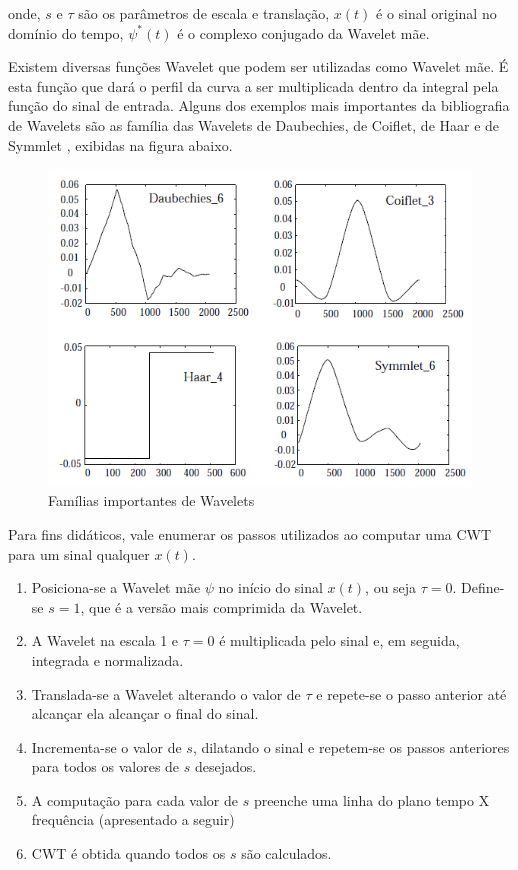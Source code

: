 \documentclass[12pt]{article}
\begin{document}
	onde, $s$ e $\tau$ são os parâmetros de escala e translação, $x(t)$ é o sinal original no domínio do tempo, $\psi^*(t)$ é o complexo conjugado da \textrm{Wavelet} mãe. 
	
	Existem diversas funções \textrm{Wavelet} que podem ser utilizadas como \textrm{Wavelet} mãe. É esta função que dará o perfil da curva a ser multiplicada dentro da integral pela função do sinal de entrada. Alguns dos exemplos mais importantes da bibliografia de \textrm{Wavelets} são as família das \textrm{Wavelets} de \textrm{Daubechies}, de \textrm{Coiflet}, de \textrm{Haar} e de \textrm{Symmlet} \cite{Wave_Graps}, exibidas na figura abaixo.
	\begin{figure}[H]
		\centering
		\includegraphics[width=0.7\linewidth]{Imagens/familiasWavelets}
		\caption{Famílias importantes de Wavelets}
		\label{fig:familiaswavelets}
	\end{figure}
	
	Para fins didáticos, vale enumerar os passos utilizados ao computar uma \textrm{CWT} para um sinal qualquer $x(t)$.
	\begin{enumerate}
		\item Posiciona-se a Wavelet mãe $\psi$ no início do sinal $x(t)$, ou seja $\tau=0$. Define-se $s=1$, que é a versão mais comprimida da \textrm{Wavelet}.
		\item A \textrm{Wavelet} na escala 1 e $\tau=0$ é multiplicada pelo sinal e, em seguida, integrada e normalizada.
		\item Translada-se a \textrm{Wavelet} alterando o valor de $\tau$ e repete-se o passo anterior até alcançar ela alcançar o final do sinal.
		\item Incrementa-se o valor de $s$, dilatando o sinal e repetem-se os passos anteriores para todos os valores de $s$ desejados.
		\item A computação para cada valor de $s$ preenche uma linha do plano tempo X frequência (apresentado a seguir)
		\item \textrm{CWT} é obtida quando todos os $s$ são calculados.		
	\end{enumerate}
	
\end{document}
